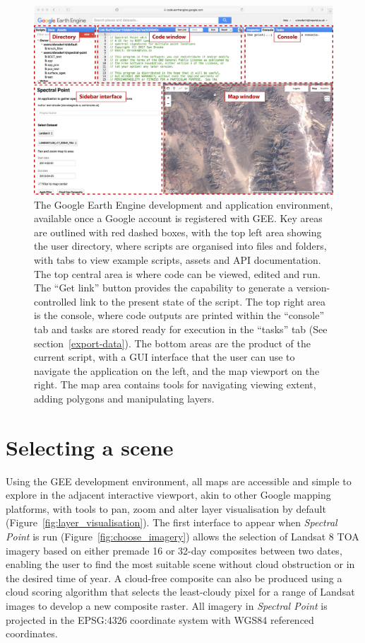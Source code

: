 \documentclass[12pt]{article}
\begin{document}
\begin{landscape}
\begin{figure}[htbp]
\centering
\includegraphics[width=1.2\textwidth]{images/workspace_fig_reduced.jpg}
\caption{The Google Earth Engine development and application environment, available once a Google account is registered with GEE. Key areas are outlined with red dashed boxes, with the top left area showing the user directory, where scripts are organised into files and folders, with tabs to view example scripts, assets and API documentation. The top central area is where code can be viewed, edited and run. The ``Get link'' button provides the capability to generate a version-controlled link to the present state of the script. The top right area is the console, where code outputs are printed within the ``console'' tab and tasks are stored ready for execution in the ``tasks'' tab (See section~\ref{export-data}). The bottom areas are the product of the current script, with a GUI interface that the user can use to navigate the application on the left, and the map viewport on the right. The map area contains tools for navigating viewing extent, adding polygons and manipulating layers.}
\label{fig:workspace_fig}
\end{figure}
\end{landscape}

\section{Selecting a scene}

Using the GEE development environment, all maps are accessible and simple to explore in the adjacent interactive viewport, akin to other Google mapping platforms, with tools to pan, zoom and alter layer visualisation by default (Figure~\ref{fig:layer_visualisation}). The first interface to appear when \textit{Spectral Point} is run (Figure~\ref{fig:choose_imagery}) allows the selection of Landsat 8 TOA imagery based on either premade 16 or 32-day composites between two dates, enabling the user to find the most suitable scene without cloud obstruction or in the desired time of year. A cloud-free composite can also be produced using a cloud scoring algorithm that selects the least-cloudy pixel for a range of Landsat images to develop a new composite raster. All imagery in \textit{Spectral Point} is projected in the EPSG:4326 coordinate system with WGS84 referenced coordinates.
\end{document}
